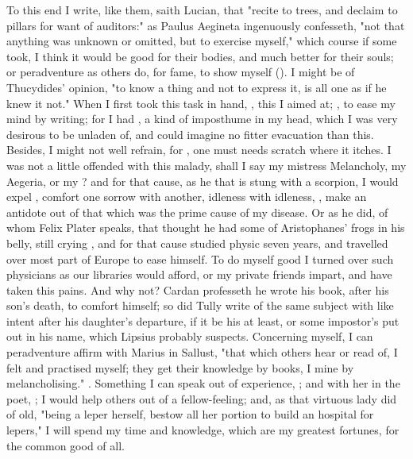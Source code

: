 To this end I write, like them, saith Lucian, that "recite to trees, and
declaim to pillars for want of auditors:" as Paulus Aegineta
ingenuously confesseth, "not that anything was unknown or omitted, but to
exercise myself," which course if some took, I think it would be good for their
bodies, and much better for their souls; or peradventure as others do, for
fame, to show myself (). I might be of Thucydides' opinion, "to know a thing
and not to express it, is all one as if he knew it not." When I first took this
task in hand, , this I aimed at; , to ease my mind by writing; for I had , a kind of imposthume in my head, which I was very desirous to be
unladen of, and could imagine no fitter evacuation than this. Besides, I might
not well refrain, for , one must needs scratch where
it itches. I was not a little offended with this malady, shall I say my
mistress Melancholy, my Aegeria, or my ? and for that cause,
as he that is stung with a scorpion, I would expel ,
comfort one sorrow with another, idleness with idleness,
, make an antidote out of that which was the prime
cause of my disease. Or as he did, of whom Felix Plater
speaks, that thought he had some of Aristophanes' frogs in his belly, still
crying , and for that cause studied
physic seven years, and travelled over most part of Europe to ease himself. To
do myself good I turned over such physicians as our libraries would afford, or
my private friends impart, and have taken this pains. And
why not? Cardan professeth he wrote his book,  after his son's death, to comfort himself; so did Tully write of
the same subject with like intent after his daughter's departure, if it be his
at least, or some impostor's put out in his name, which Lipsius probably
suspects. Concerning myself, I can peradventure affirm with Marius in Sallust,
"that which others hear or read of, I felt and practised
myself; they get their knowledge by books, I mine by melancholising."
. Something I can speak out of experience,
; and with her in the poet,
; I would help others out of a fellow-feeling;
and, as that virtuous lady did of old, "being a leper
herself, bestow all her portion to build an hospital for lepers," I will spend
my time and knowledge, which are my greatest fortunes, for the common good of
all.

